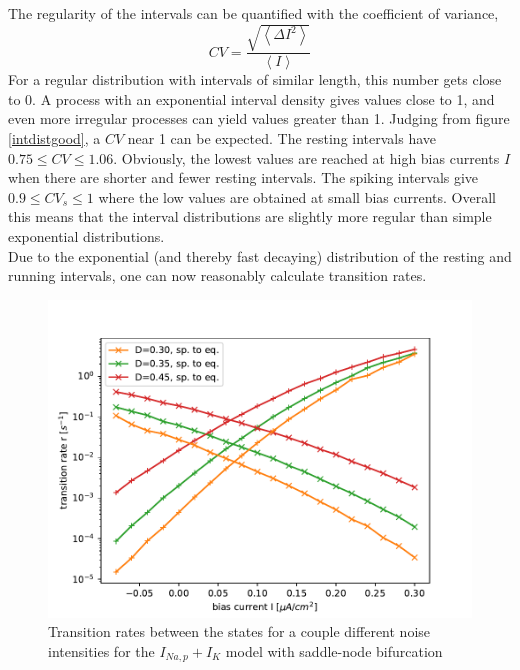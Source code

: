 \documentclass[12pt,a4paper]{article}
\begin{document}
The regularity of the intervals can be quantified with the coefficient of variance\cite{cvref},
\begin{equation}
CV=\frac{\sqrt{\left<\Delta I^2\right>}}{\left<I\right>}
\end{equation} 
For a regular distribution with intervals of similar length, this number gets close to 0. A process with an exponential interval density gives values close to 1, and even more irregular processes can yield values greater than 1. Judging from figure \ref{intdistgood}, a $CV$ near 1 can be expected. The resting intervals have $0.75\leq CV\leq1.06$. Obviously, the lowest values are reached at high bias currents $I$ when there are shorter and fewer resting intervals. The spiking intervals give $0.9\leq CV_s\leq 1$ where the low values are obtained at small bias currents. Overall this means that the interval distributions are slightly more regular than simple exponential distributions.
\\
Due to the exponential (and thereby fast decaying) distribution of the resting and running intervals, one can now reasonably calculate transition rates.
\begin{figure}[H]
	\centering
	\includegraphics[scale=1]{tranratesneur32.pdf}\caption{Transition rates between the states for a couple different noise intensities for the $I_{Na,p}+I_K$ model with saddle-node bifurcation}
	\label{tranrateneur}
\end{figure}
\end{document}

